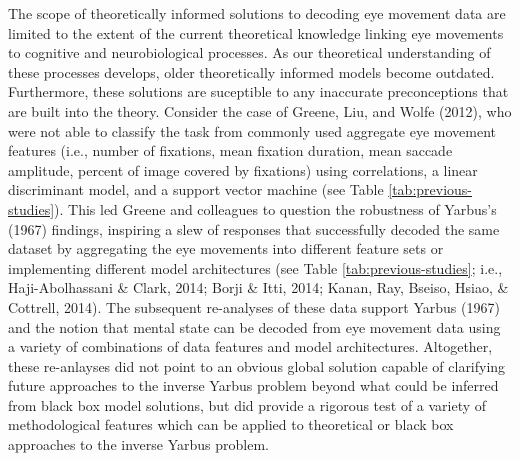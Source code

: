 \documentclass[
  english,
  man,floatsintext]{apa6}
\begin{document}
The scope of theoretically informed solutions to decoding eye movement data are limited to the extent of the current theoretical knowledge linking eye movements to cognitive and neurobiological processes. As our theoretical understanding of these processes develops, older theoretically informed models become outdated. Furthermore, these solutions are suceptible to any inaccurate preconceptions that are built into the theory. Consider the case of Greene, Liu, and Wolfe (2012), who were not able to classify the task from commonly used aggregate eye movement features (i.e., number of fixations, mean fixation duration, mean saccade amplitude, percent of image covered by fixations) using correlations, a linear discriminant model, and a support vector machine (see Table \ref{tab:previous-studies}). This led Greene and colleagues to question the robustness of Yarbus's (1967) findings, inspiring a slew of responses that successfully decoded the same dataset by aggregating the eye movements into different feature sets or implementing different model architectures (see Table \ref{tab:previous-studies}; i.e., Haji-Abolhassani \& Clark, 2014; Borji \& Itti, 2014; Kanan, Ray, Bseiso, Hsiao, \& Cottrell, 2014). The subsequent re-analyses of these data support Yarbus (1967) and the notion that mental state can be decoded from eye movement data using a variety of combinations of data features and model architectures. Altogether, these re-anlayses did not point to an obvious global solution capable of clarifying future approaches to the inverse Yarbus problem beyond what could be inferred from black box model solutions, but did provide a rigorous test of a variety of methodological features which can be applied to theoretical or black box approaches to the inverse Yarbus problem.
\end{document}
